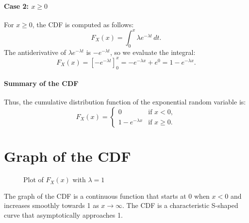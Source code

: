     \paragraph{Case 2: $x \geq 0$}
    For $x \geq 0$, the CDF is computed as follows:
    \[
    F_X(x) = \int_0^{x} \lambda e^{-\lambda t} \, dt.
    \]
    The antiderivative of $\lambda e^{-\lambda t}$ is $-e^{-\lambda t}$, so we evaluate the integral:
    \[
    F_X(x) = \left[ -e^{-\lambda t} \right]_0^x = -e^{-\lambda x} + e^0 = 1 - e^{-\lambda x}.
    \]
    
    \paragraph{Summary of the CDF}
    Thus, the cumulative distribution function of the exponential random variable is:
    \[
    F_X(x) = \begin{cases} 
    0 & \text{if } x < 0, \\
    1 - e^{-\lambda x} & \text{if } x \geq 0.
    \end{cases}
    \]
    \section{Graph of the CDF}
    \begin{figure}[h]
        \centering
        \caption{Plot of $F_X(x)$ with $\lambda = 1$}
    \end{figure}
    The graph of the CDF is a continuous function that starts at 0 when $x < 0$ and increases smoothly towards 1 as $x \to \infty$. The CDF is a characteristic S-shaped curve that asymptotically approaches 1.
    
